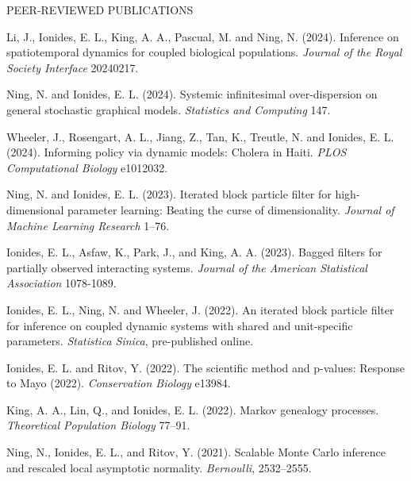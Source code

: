 \begin{reflist}{PEER-REVIEWED PUBLICATIONS}

\item Li, J., Ionides, E. L., King, A. A., Pascual, M. and Ning, N. (2024). Inference on spatiotemporal dynamics for coupled biological populations. {\it Journal of the Royal Society Interface} {}{\separator}20240217.
  
\item Ning, N. and Ionides, E. L. (2024). Systemic infinitesimal over-dispersion on general stochastic graphical models. {\it Statistics and Computing} {}{\separator}147.

\item Wheeler, J., Rosengart, A. L., Jiang, Z., Tan, K., Treutle, 
  N. and Ionides, E. L. (2024). Informing policy via dynamic models: Cholera in Haiti. {\it PLOS Computational Biology} {}{\separator}e1012032.

  \item Ning, N. and Ionides, E. L. (2023). Iterated block particle filter for high-dimensional parameter learning: Beating the curse of dimensionality. {\it Journal of Machine Learning Research} {}{\separator}1--76.

    \item  Ionides, E. L., Asfaw, K., Park, J., and King, A. A. (2023). Bagged filters for partially observed interacting systems. {\em Journal of the American Statistical Association} {}{\separator}1078-1089. 

  \item Ionides, E. L., Ning, N. and Wheeler, J. (2022). An iterated block particle filter for inference on coupled dynamic systems with shared and unit-specific parameters. {\it Statistica Sinica}, pre-published online.

\item Ionides, E. L. and Ritov, Y. (2022). The scientific method and p-values: Response to Mayo (2022). {\em Conservation Biology} {}{\separator}e13984.

\item  King, A. A., Lin, Q., and Ionides, E. L. (2022). Markov genealogy processes. {\em Theoretical Population Biology} {}{\separator}77--91.
  
\item Ning, N., Ionides, E. L., and Ritov, Y. (2021). Scalable Monte Carlo inference and rescaled local asymptotic normality. {\em Bernoulli}, {}{\separator}2532--2555.
  

\end{reflist}
